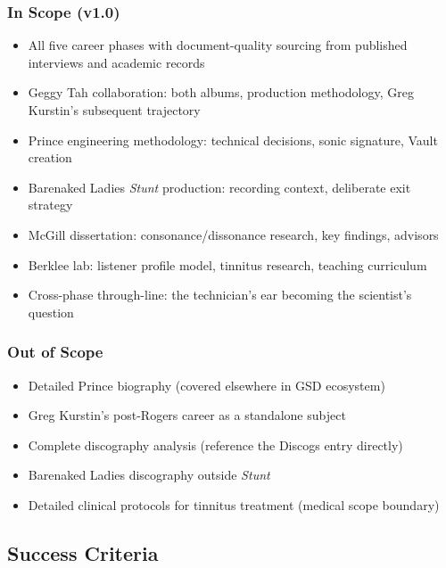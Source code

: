 \documentclass[11pt,letterpaper]{article}
\begin{document}
\subsubsection{In Scope (v1.0)}
\begin{itemize}[leftmargin=2em]
  \item All five career phases with document-quality sourcing from published interviews and academic records
  \item Geggy Tah collaboration: both albums, production methodology, Greg Kurstin's subsequent trajectory
  \item Prince engineering methodology: technical decisions, sonic signature, Vault creation
  \item Barenaked Ladies \textit{Stunt} production: recording context, deliberate exit strategy
  \item McGill dissertation: consonance/dissonance research, key findings, advisors
  \item Berklee lab: listener profile model, tinnitus research, teaching curriculum
  \item Cross-phase through-line: the technician's ear becoming the scientist's question
\end{itemize}

\subsubsection{Out of Scope}
\begin{itemize}[leftmargin=2em]
  \item Detailed Prince biography (covered elsewhere in GSD ecosystem)
  \item Greg Kurstin's post-Rogers career as a standalone subject
  \item Complete discography analysis (reference the Discogs entry directly)
  \item Barenaked Ladies discography outside \textit{Stunt}
  \item Detailed clinical protocols for tinnitus treatment (medical scope boundary)
\end{itemize}

\subsection{Success Criteria}
\end{document}
